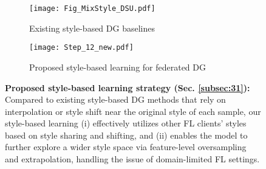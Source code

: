 \documentclass{article}
\theoremstyle{plain}
\theoremstyle{definition}
\theoremstyle{remark}
\begin{document}
\begin{figure}[t]
       \centering
     \begin{subfigure}[b]{0.38\textwidth}
         \centering
         \texttt{[image: Fig\_MixStyle\_DSU.pdf]}
         \caption{Existing style-based DG baselines}
\label{fig:aaaaaaaaa}    
 \end{subfigure}
     \begin{subfigure}[b]{0.6\textwidth}
         \centering
         \texttt{[image: Step\_12\_new.pdf]}
         \caption{Proposed style-based learning for federated DG}
\label{fig:bbbbbbbbbb}    
     \end{subfigure}
 \caption{\textbf{Proposed style-based learning strategy (Sec. \ref{subsec:31}):} Compared to existing style-based DG methods that rely on interpolation or style shift near the original style of each sample, our  style-based learning  (i) effectively utilizes other FL clients' styles based on style sharing and shifting, and (ii) enables the model to further  explore a wider style space   via feature-level oversampling and extrapolation, handling the issue  of domain-limited FL settings.}
        \label{fig:Main1_Style} 
        \vspace{-2mm}
 \end{figure}
     
%     
     
\end{document}
